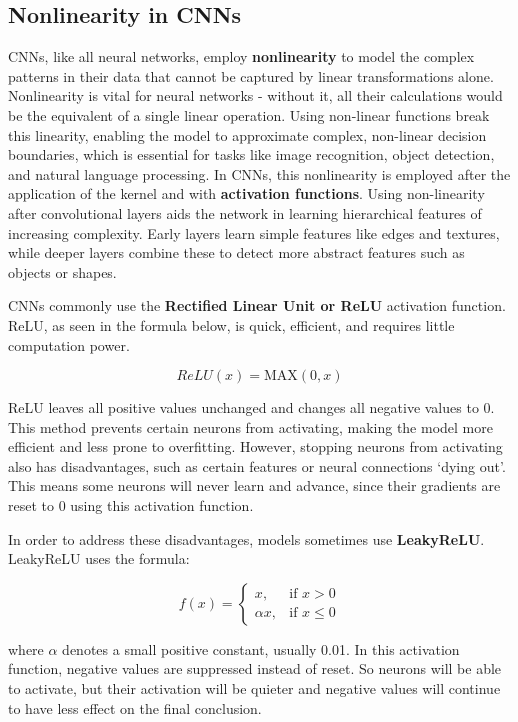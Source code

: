     \subsection{Nonlinearity in CNNs}
        CNNs, like all neural networks, employ \textbf{nonlinearity} to model the complex patterns in their data that cannot be captured by linear transformations alone. Nonlinearity is vital for neural networks - without it, all their calculations would be the equivalent of a single linear operation. Using non-linear functions break this linearity, enabling the model to approximate complex, non-linear decision boundaries, which is essential for tasks like image recognition, object detection, and natural language processing. In CNNs, this nonlinearity is employed after the application of the kernel and with \textbf{activation functions}. Using non-linearity after convolutional layers aids the network in learning hierarchical features of increasing complexity. Early layers learn simple features like edges and textures, while deeper layers combine these to detect more abstract features such as objects or shapes. \break

        CNNs commonly use the \textbf{Rectified Linear Unit or ReLU} activation function. ReLU, as seen in the formula below, is quick, efficient, and requires little computation power. 
        
        $$ReLU(x) = \mathrm{MAX}(0,x)$$
        
        ReLU leaves all positive values unchanged and changes all negative values to 0. This method prevents certain neurons from activating, making the model more efficient and less prone to overfitting. However, stopping neurons from activating also has disadvantages, such as certain features or neural connections `dying out'. This means some neurons will never learn and advance, since their gradients are reset to 0 using this activation function. \break

        In order to address these disadvantages, models sometimes use \textbf{LeakyReLU}. LeakyReLU uses the formula:

        \[f(x)= 
        \begin{cases}
            x,& \text{if } x > 0\\
            \alpha x, & \text{if } x \leq 0
        \end{cases}
        \]

        where $\alpha$ denotes a small positive constant, usually 0.01. In this activation function, negative values are suppressed instead of reset. So neurons will be able to activate, but their activation will be quieter and negative values will continue to have less effect on the final conclusion.

